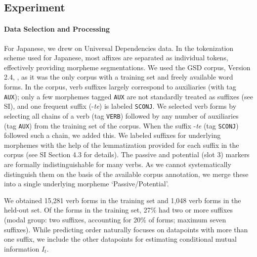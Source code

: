 

\subsection{Experiment}
\paragraph{Data Selection and Processing}
For Japanese, we drew on Universal Dependencies data.
In the tokenization scheme used for Japanese, most affixes are separated as individual tokens, effectively providing morpheme segmentations.
We used the GSD corpus, Version 2.4, \citep{tanaka2016universal, asahara2018universal}, as it was the only corpus with a training set and freely available word forms.
In the corpus, verb suffixes largely correspond to auxiliaries (with tag \texttt{AUX}); only a few morphemes tagged \texttt{AUX} are not standardly treated as suffixes (see SI), and one frequent suffix (-\textit{te}) is labeled \texttt{SCONJ}.
We selected verb forms by selecting all chains of a verb (tag \texttt{VERB}) followed by any number of auxiliaries (tag \texttt{AUX}) from the training set of the corpus. When the suffix -\textit{te} (tag \texttt{SCONJ}) followed such a chain, we added this.
We labeled suffixes for underlying morphemes with the help of the lemmatization provided for each suffix in the corpus (see SI Section 4.3 for details).
The passive and potential (slot 3) markers are formally indistinguishable for many verbs.
As we cannot systematically distinguish them on the basis of the available corpus annotation, we merge these into a single underlying morpheme `Passive/Potential'.

We obtained 15,281 verb forms in the training set and 1,048 verb forms in the held-out set.
Of the forms in the training set, 27\% had two or more suffixes (modal group: two suffixes, accounting for 20\% of forms; maximum seven suffixes).
While predicting order naturally focuses on datapoints with more than one suffix, we include the other datapoints for estimating conditional mutual information $I_t$.


